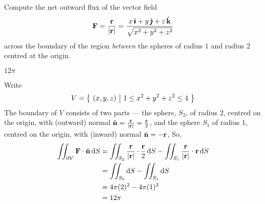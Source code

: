 \begin{question}[M317 2011A] %
Compute the net outward flux of the vector field
\begin{equation*}
\mathbf{F} = \frac{\mathbf{r}}{|\mathbf{r}|}
    = \frac{x\,\hat{\pmb{\imath}}+y\,\hat{\pmb{\jmath}}+z\,\hat{\mathbf{k}}}{\sqrt{x^2+y^2+z^2}}
\end{equation*}
across the boundary of the region \emph{between} the spheres of 
radius $1$ and radius $2$ centred at the origin.
\end{question}

%

\begin{answer} 
$12\pi$
\end{answer}

\begin{solution} 
Write
\begin{equation*}
V=\big\{ \ (x,y,z)\ \big|\  1\le x^2+y^2+z^2\le 4\ \big\}
\end{equation*}
The boundary of $V$ consists of two parts ---
the sphere, $S_2$, of radius $2$, centred on the origin,
with (outward) normal $\hat{\mathbf{n}}=\frac{\mathbf{r}}{|\mathbf{r}|}=\frac{\mathbf{r}}{2}$,
and the sphere  $S_1$ of radius $1$, centred on the origin,
with (inward) normal $\hat{\mathbf{n}} = -\mathbf{r}$, So,
\begin{align*}
\iint_{\partial V} \mathbf{F}\cdot\hat{\mathbf{n}}\,\mathrm{d}S
&=\iint_{S_2} \frac{\mathbf{r}}{|\mathbf{r}|}\cdot\frac{\mathbf{r}}{2}\,\mathrm{d}S
-\iint_{S_1} \frac{\mathbf{r}}{|\mathbf{r}|}\cdot\mathbf{r}\,\mathrm{d}S \\
&=\iint_{S_2} \mathrm{d}S
   -\iint_{S_1} \mathrm{d}S \\
&=4\pi(2)^2 -4\pi(1)^2 \\
&=12\pi
\end{align*} 
\end{solution}


